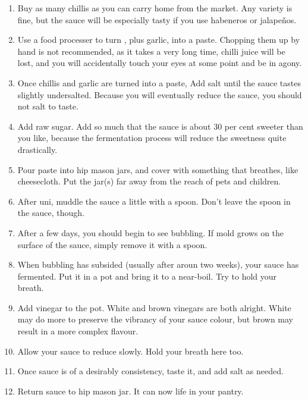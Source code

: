 \begin{enumerate}
    \item Buy as many chillis as you can carry home from the market. Any variety is fine, but the sauce will be especially tasty if you use habeneros or jalape{\~n}os.
    \item Use a food processer to turn , plus garlic, into a paste. Chopping them up by hand is not recommended, as it takes a very long time, chilli juice will be lost, and you will accidentally touch your eyes at some point and be in agony.
    \item Once chillis and garlic are turned into a paste, Add salt until the sauce tastes slightly undersalted. Because you will eventually reduce the sauce, you should not salt to taste.
    \item Add raw sugar. Add so much that the sauce is about 30 per cent sweeter than you like, because the fermentation process will reduce the sweetness quite drastically.
    \item Pour paste into hip mason jars, and cover with something that breathes, like cheesecloth. Put the jar(s) far away from the reach of pets and children.
    \item After uni, muddle the sauce a little with a spoon. Don't leave the spoon in the sauce, though.
    \item After a few days, you should begin to see bubbling. If mold grows on the surface of the sauce, simply remove it with a spoon.
    \item When bubbling has subsided (usually after aroun two weeks), your sauce has fermented. Put it in a pot and bring it to a near-boil. Try to hold your breath.
    \item Add vinegar to the pot. White and brown vinegars are both alright. White may do more to preserve the vibrancy of your sauce colour, but brown may result in a more complex flavour.
    \item Allow your sauce to reduce slowly. Hold your breath here too.
    \item Once sauce is of a desirably consistency, taste it, and add salt as needed.
    \item Return sauce to hip mason jar. It can now life in your pantry.
\end{enumerate}




\vfill
\pagebreak


